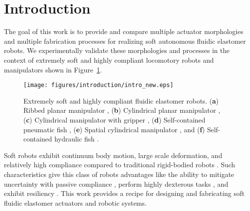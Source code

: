 
\section{Introduction}
\label{sec:Introduction}
The goal of this work is to provide and compare multiple actuator morphologies and multiple fabrication processes for realizing soft autonomous fluidic elastomer robots.
%
We experimentally validate these morphologies and processes in the context of extremely soft and highly compliant locomotory robots and manipulators shown in Figure~\ref{fig:intro_new}.
\begin{figure}[!t]
  \centering
  \texttt{[image: figures/introduction/intro\_new.eps]}
  \caption{Extremely soft and highly compliant fluidic elastomer robots. (\textbf{a}) Ribbed planar manipulator \citep{marchese2014design}, (\textbf{b}) Cylindrical planar manipulator \citep{marchese2014whole}, (\textbf{c}) Cylindrical manipulator with gripper \citep{katzschmann2015autonomous}, (\textbf{d}) Self-contained pneumatic fish \citep{marchese2014autonomous}, (\textbf{e}) Spatial cylindrical manipulator \citep{marchese2015design}, and (\textbf{f}) Self-contained hydraulic fish \citep{katzschmann2014hydraulic}. }\label{fig:intro_new}
\end{figure} 

Soft robots exhibit continuum body motion, large scale deformation, and relatively high compliance compared to traditional rigid-bodied robots \citep{trivedi2008soft}.
%
Such characteristics give this class of robots advantages like the ability to mitigate uncertainty with passive compliance \citep{mcmahan2006field}, perform highly dexterous tasks \citep{deimel2014novel}, and exhibit resiliency \citep{tolley2014resilient}.
%
This work provides a recipe for designing and fabricating soft fluidic elastomer actuators and robotic systems.

